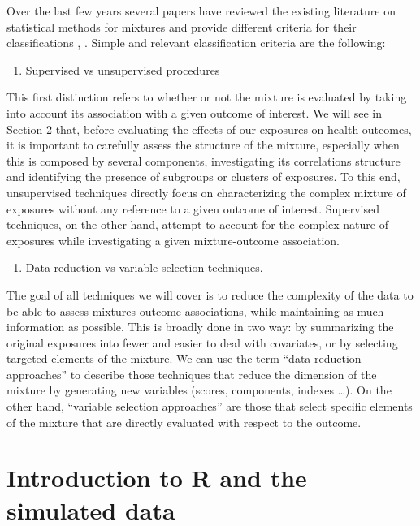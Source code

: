 \documentclass[
]{book}
\providecommand{\tightlist}{%
  \setlength{\itemsep}{0pt}\setlength{\parskip}{0pt}}
\begin{document}
Over the last few years several papers have reviewed the existing literature on statistical methods for mixtures and provide different criteria for their classifications \citep{hamra2018environmental}, \citep{stafoggia2017statistical}. Simple and relevant classification criteria are the following:

\begin{enumerate}
\def\labelenumi{\arabic{enumi}.}
\tightlist
\item
  Supervised vs unsupervised procedures
\end{enumerate}

This first distinction refers to whether or not the mixture is evaluated by taking into account its association with a given outcome of interest. We will see in Section 2 that, before evaluating the effects of our exposures on health outcomes, it is important to carefully assess the structure of the mixture, especially when this is composed by several components, investigating its correlations structure and identifying the presence of subgroups or clusters of exposures. To this end, unsupervised techniques directly focus on characterizing the complex mixture of exposures without any reference to a given outcome of interest. Supervised techniques, on the other hand, attempt to account for the complex nature of exposures while investigating a given mixture-outcome association.

\begin{enumerate}
\def\labelenumi{\arabic{enumi}.}
\setcounter{enumi}{1}
\tightlist
\item
  Data reduction vs variable selection techniques.
\end{enumerate}

The goal of all techniques we will cover is to reduce the complexity of the data to be able to assess mixtures-outcome associations, while maintaining as much information as possible. This is broadly done in two way: by summarizing the original exposures into fewer and easier to deal with covariates, or by selecting targeted elements of the mixture. We can use the term ``data reduction approaches'' to describe those techniques that reduce the dimension of the mixture by generating new variables (scores, components, indexes \dots). On the other hand, ``variable selection approaches'' are those that select specific elements of the mixture that are directly evaluated with respect to the outcome.

\hypertarget{introduction-to-r-and-the-simulated-data}{%
\section{Introduction to R and the simulated data}\label{introduction-to-r-and-the-simulated-data}}
\end{document}

